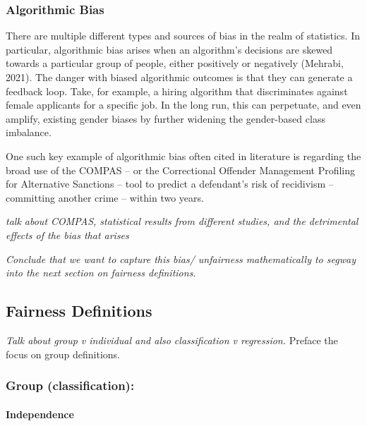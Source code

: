 \documentclass[
]{article}
\begin{document}
\hypertarget{algorithmic-bias}{%
\subsubsection{Algorithmic Bias}\label{algorithmic-bias}}

There are multiple different types and sources of bias in the realm of
statistics. In particular, algorithmic bias arises when an algorithm's
decisions are skewed towards a particular group of people, either
positively or negatively (Mehrabi, 2021). The danger with biased
algorithmic outcomes is that they can generate a feedback loop. Take,
for example, a hiring algorithm that discriminates against female
applicants for a specific job. In the long run, this can perpetuate, and
even amplify, existing gender biases by further widening the
gender-based class imbalance.

One such key example of algorithmic bias often cited in literature is
regarding the broad use of the COMPAS -- or the Correctional Offender
Management Profiling for Alternative Sanctions -- tool to predict a
defendant's risk of recidivism -- committing another crime -- within two
years.

\emph{talk about COMPAS, statistical results from different studies, and
the detrimental effects of the bias that arises}

\emph{Conclude that we want to capture this bias/ unfairness
mathematically to segway into the next section on fairness definitions.}

\hypertarget{fairness-definitions}{%
\subsection{Fairness Definitions}\label{fairness-definitions}}

\emph{Talk about group v individual and also classification v
regression.} Preface the focus on group definitions.

\hypertarget{group-classification}{%
\subsubsection{Group (classification):}\label{group-classification}}

\hypertarget{independence}{%
\paragraph{Independence}\label{independence}}
\end{document}
